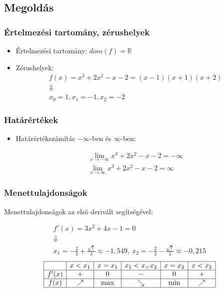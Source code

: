 \documentclass[ignorenonframetext]{beamer}
\begin{document}
\subsection{Megoldás}
\begin{frame}[fragile]
\frametitle{Értelmezési tartomány, zérushelyek}
\begin{itemize}
    \item Értelmezési tartomány:
          $dom(f)=\mathbb{R}$
    \item Zérushelyek:
          \begin{gather*}
              f(x)=x^3+2x^2-x-2=(x-1)(x+1)(x+2) \\
              \Downarrow                        \\
              x_0=1,x_1=-1,x_2=-2
          \end{gather*}
\end{itemize}
\end{frame}
\begin{frame}[fragile]
\frametitle{Határértékek}
\begin{itemize}
    \item Határértékszámítás $-\infty$-ben és $\infty$-ben:

    \begin{gather*}
        \lim\limits_{x \to -\infty} x^3+2x^2-x-2=-\infty\\
        \lim\limits_{x \to \infty} x^3+2x^2-x-2=\infty
    \end{gather*}
\end{itemize}


\end{frame}
\begin{frame}[fragile]
\frametitle{Menettulajdonságok}
Menettulajdonságok az elsõ derivált segítségével:

\begin{gather*}
    f'(x)=3x^2+4x-1=0\\
    \Downarrow\\
    x_1=-\frac{2}{3}+\frac{\sqrt{7}}{3}\approx-1,549,
    \ x_2=-\frac{2}{3}-\frac{\sqrt{7}}{3}\approx-0,215
\end{gather*}
\[
    \begin{array}{|c|c|c|c|c|c|}
        \hline
              & x<x_1    & x=x_1 & x_1<x_<x_2 & x=x_2 & x<x_2    \\
        \hline
        f'(x) & +        & 0     & -          & 0     & +        \\
        \hline
        f(x)  & \nearrow & \max  & \searrow   & \min  & \nearrow \\
        \hline
    \end{array}
\]
\end{frame}
\end{document}
